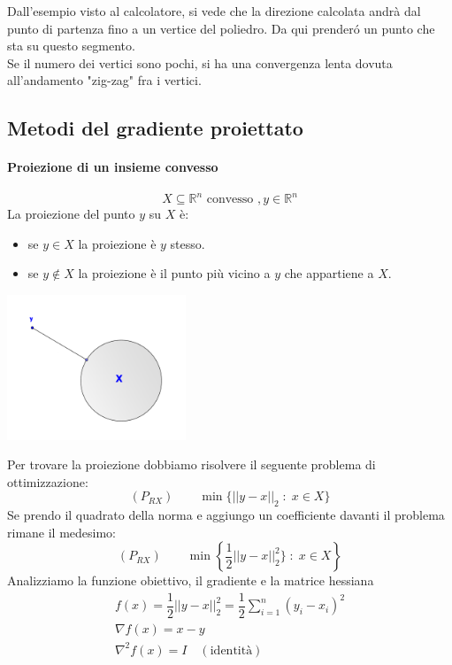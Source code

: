 \begin{notes}
  Dall'esempio visto al calcolatore, si vede che la direzione
  calcolata andr\`a dal punto di partenza fino a un vertice del
  poliedro. Da qui
  prender\'o un punto che sta su questo segmento. \\
  Se il numero dei vertici sono pochi, si ha una convergenza lenta
  dovuta all'andamento "zig-zag" fra i vertici.
\end{notes}


\subsection{Metodi del gradiente proiettato}
\paragraph{Proiezione di un insieme convesso}
$$ X \subseteq \mathbb{R}^{n} \text{ convesso }, y \in \mathbb{R}^{n}$$
La proiezione del punto $y$ su $X$ \`e:
\begin{itemize}
\item se $y \in X$ la proiezione \`e $y$ stesso.
\item se $y \notin X$ la proiezione \`e il punto pi\`u vicino a $y$
  che appartiene a $X$.
\end{itemize}

\begin{center}
  \includegraphics[width=0.4\textwidth]{imgs/proiezione.png}
\end{center}

Per trovare la proiezione dobbiamo risolvere il seguente problema di ottimizzazione:
$$(P_{RX}) \qquad \min \{ || y - x ||_{2} \; : \; x \in X \}$$
Se prendo il quadrato della norma e aggiungo un coefficiente davanti
il problema rimane il medesimo:
$$(P_{RX}) \qquad \min \left\{ \dfrac{1}{2}|| y - x ||_{2}^{2} \}\; : \; x \in X \right\}  $$
Analizziamo la funzione obiettivo, il gradiente e la matrice hessiana
$$ 
\begin{array}{l}
  f(x) = \dfrac{1}{2} || y - x||_{2}^{2} =
  \dfrac{1}{2} \displaystyle \sum_{i=1}^{n} (y_i - x_i)^{2} \\
  \nabla f(x) = x - y \\
  \nabla^{2}f(x) = I \quad (\text{identit\`a})  
\end{array}
$$

